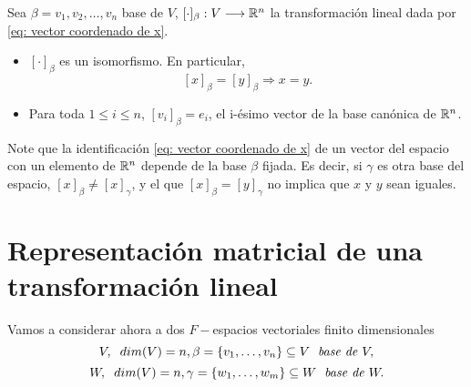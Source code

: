 \begin{prop}
Sea $\beta = {v_{1}, v_{2}, \ldots, v_{n}}$ base de $V$,
$[\cdot]_{\beta}: V \longrightarrow \mathbb{R}^{n}$ la transformación lineal
dada por 
\eqref{eq: vector coordenado de x}.
\begin{itemize}
	\item $[\cdot]_{\beta}$ es un isomorfismo. En particular,
	\[
	[x]_{\beta} = [y]_{\beta} \Rightarrow x = y.
	\]
	\item Para toda $1 \leq i \leq n$, $[v_{i}]_{\beta} = e_{i}$, 
	el i-ésimo vector de la base canónica de $\mathbb{R}^{n}$.
\end{itemize}
\end{prop}

Note que la identificación \eqref{eq: vector coordenado de x}
de un vector del espacio con un elemento de $\mathbb{R}^{n}$ depende de 
la base $\beta$ fijada. Es decir, si $\gamma$ es otra base 
del espacio, $[x]_{\beta} \neq [x]_{\gamma}$, y 
el que $[x]_{\beta} = [y]_{\gamma}$ no implica que $x$ y $y$
sean iguales. 


\section{Representación matricial de una transformación lineal}

Vamos a considerar ahora a dos $F-$espacios vectoriales finito 
dimensionales
\[
V, \hspace{0.2cm} dim(V) = n,\beta = \{ v_{1}, \ldots, v_{n} \}
\subseteq V \hspace{0.1cm} \textit{ base de }V,
\]
\[
W, \hspace{0.2cm} dim(V) = n,\gamma = \{ w_{1}, \ldots, w_{m} \}
\subseteq W \hspace{0.1cm} \textit{ base de }W.
\]

